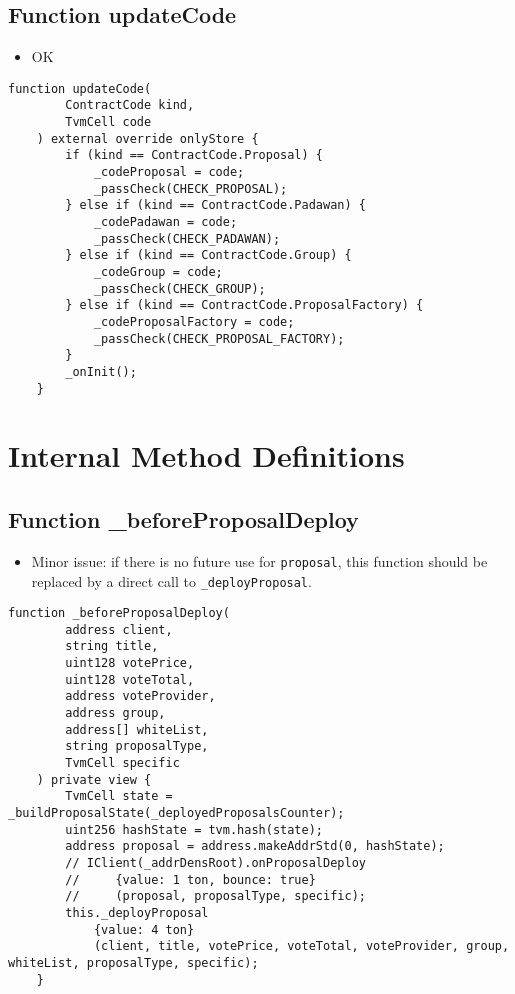 \subsection{Function updateCode}

\begin{itemize}
\item OK
\end{itemize}

\begin{lstlisting}[firstnumber=103]
    function updateCode(
        ContractCode kind,
        TvmCell code
    ) external override onlyStore {
        if (kind == ContractCode.Proposal) {
            _codeProposal = code;
            _passCheck(CHECK_PROPOSAL);
        } else if (kind == ContractCode.Padawan) {
            _codePadawan = code;
            _passCheck(CHECK_PADAWAN);
        } else if (kind == ContractCode.Group) {
            _codeGroup = code;
            _passCheck(CHECK_GROUP);
        } else if (kind == ContractCode.ProposalFactory) {
            _codeProposalFactory = code;
            _passCheck(CHECK_PROPOSAL_FACTORY);
        }
        _onInit();
    }
\end{lstlisting}

\section{Internal Method Definitions}


\subsection{Function \_{}beforeProposalDeploy}

\begin{itemize}
\item Minor issue: if there is no future use for {\tt proposal}, this
  function should be replaced by a direct call to {\tt \_deployProposal}.
\end{itemize}

\begin{lstlisting}[firstnumber=172]
    function _beforeProposalDeploy(
        address client,
        string title,
        uint128 votePrice,
        uint128 voteTotal,
        address voteProvider,
        address group,
        address[] whiteList,
        string proposalType,
        TvmCell specific
    ) private view {
        TvmCell state = _buildProposalState(_deployedProposalsCounter);
        uint256 hashState = tvm.hash(state);
        address proposal = address.makeAddrStd(0, hashState);
        // IClient(_addrDensRoot).onProposalDeploy
        //     {value: 1 ton, bounce: true}
        //     (proposal, proposalType, specific);
        this._deployProposal
            {value: 4 ton}
            (client, title, votePrice, voteTotal, voteProvider, group, whiteList, proposalType, specific);
    }
\end{lstlisting}

